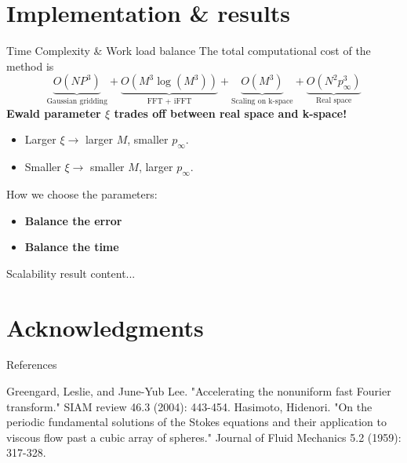 \documentclass{beamer}
\begin{document}
\section{Implementation \& results}
\begin{frame}{Time Complexity \& Work load balance}
The total computational cost of the method is
\begin{equation}
\underbrace{O(NP^3)}_{\text{Gaussian gridding}} + \underbrace{O(M^3 \log(M^3))}_{\text{FFT + iFFT}} + \underbrace{O(M^3)}_{\text{Scaling on k-space}} + \underbrace{O(N^2 p_{\infty}^3)}_{\text{Real space}}
\end{equation}
\textbf{Ewald parameter $\xi$ trades off between real space and k-space!}
\begin{itemize}
	\item Larger $\xi \rightarrow$ larger $M$, smaller $p_{\infty}$.
	\item Smaller $\xi \rightarrow$ smaller $M$, larger $p_{\infty}$.
\end{itemize}
How we choose the parameters:
\begin{itemize}
	\item \textbf{Balance the error} \\
	\item \textbf{Balance the time}
\end{itemize}
\end{frame}

\begin{frame}{Scalability result}
content...
\end{frame}
\section{Acknowledgments}

\begin{frame}{References}
	\begin{thebibliography}{0}
		Greengard, Leslie, and June-Yub Lee. "Accelerating the nonuniform fast Fourier transform." SIAM review 46.3 (2004): 443-454.
		Hasimoto, Hidenori. "On the periodic fundamental solutions of the Stokes equations and their application to viscous flow past a cubic array of spheres." Journal of Fluid Mechanics 5.2 (1959): 317-328.
	\end{thebibliography}
\end{frame}
\end{document}
